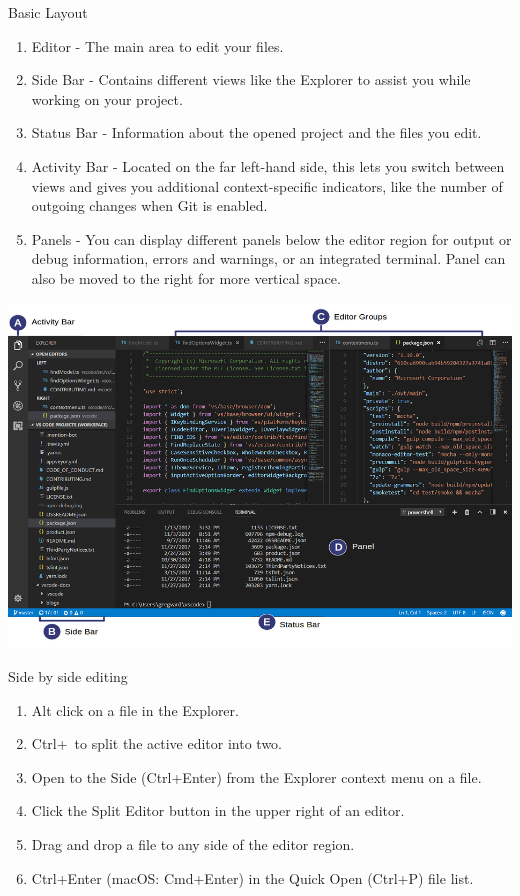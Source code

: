 \documentclass[xcolor=x11names,compress]{beamer}
\renewcommand{\(}{\begin{columns}}
\renewcommand{\)}{\end{columns}}
\newcommand{\<}[1]{\begin{column}{#1}}
\renewcommand{\>}{\end{column}}
\begin{document}
\begin{frame}{Basic Layout}
	\begin{enumerate}
		\item Editor - The main area to edit your files. 
		\item Side Bar - Contains different views like the Explorer to assist you while working on your project.
		\item Status Bar - Information about the opened project and the files you edit.
		\item Activity Bar - Located on the far left-hand side, this lets you switch between views and gives you additional context-specific indicators, like the number of outgoing changes when Git is enabled.
		\item Panels - You can display different panels below the editor region for output or debug information, errors and warnings, or an integrated terminal. Panel can also be moved to the right for more vertical space.
	\end{enumerate}
\end{frame}
\begin{frame}
	\includegraphics[width = \textwidth, height = \textheight]{s1.png}
\end{frame}

\begin{frame}{Side by side editing}
	\begin{enumerate}
		\item Alt click on a file in the Explorer.
		\item Ctrl+\ to split the active editor into two.
		\item Open to the Side (Ctrl+Enter) from the Explorer context menu on a file.
		\item Click the Split Editor button in the upper right of an editor.
		\item 	Drag and drop a file to any side of the editor region.
		\item 		Ctrl+Enter (macOS: Cmd+Enter) in the Quick Open (Ctrl+P) file list.
	\end{enumerate}
\end{frame}  
\end{document}
